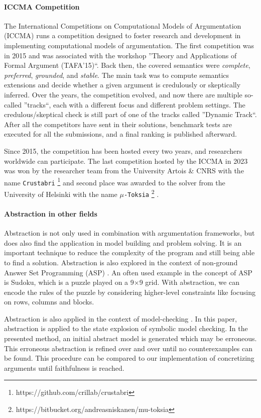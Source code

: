 \paragraph{ICCMA Competition} The International Competitions on Computational Models of Argumentation (ICCMA) runs a competition designed to foster research and development in implementing computational models of argumentation. The first competition was in 2015 and was associated with the workshop ''Theory and Applications of Formal Argument (TAFA'15)``. Back then, the covered semantics were \emph{complete}, \emph{preferred}, \emph{grounded}, and \emph{stable}. The main task was to compute semantics extensions and decide whether a given argument is credulously or skeptically inferred. Over the years, the competition evolved, and now there are multiple so-called ''tracks``, each with a different focus and different problem settings. The credulous/skeptical check is still part of one of the tracks called ''Dynamic Track``. After all the competitors have sent in their solutions, benchmark tests are executed for all the submissions, and a final ranking is published afterward.

Since 2015, the competition has been hosted every two years, and researchers worldwide can participate. The last competition hosted by the ICCMA in 2023 was won by the researcher team from the University Artois \& CNRS with the name \texttt{Crustabri} \footnote{https://github.com/crillab/crustabri} and second place was awarded to the solver from the University of Helsinki with the name \texttt{$\mu$-Toksia} \footnote{https://bitbucket.org/andreasniskanen/mu-toksia} \cite{DBLP:conf/kr/NiskanenJ20a}.


\paragraph{Abstraction in other fields} Abstraction is not only used in combination with argumentation frameworks, but does also find the application in model building and problem solving. It is an important technique to reduce the complexity of the program and still being able to find a solution. Abstraction is also explored in the context of non-ground Answer Set Programming (ASP) \cite{researchGate:ASPforNonG}. An often used example in the concept of ASP is Sudoku, which is a puzzle played on a 9$\times$9 grid. With abstraction, we can encode the rules of the puzzle by considering higher-level constraints like focusing on rows, columns and blocks.

Abstraction is also applied in the context of model-checking \cite{10.1145/876638.876643}. In this paper, abstraction is applied to the state explosion of symbolic model checking. In the presented method, an initial abstract model is generated which may be erroneous. This erroneous abstraction is refined over and over until no counterexamples can be found. This procedure can be compared to our implementation of concretizing arguments until faithfulness is reached.

